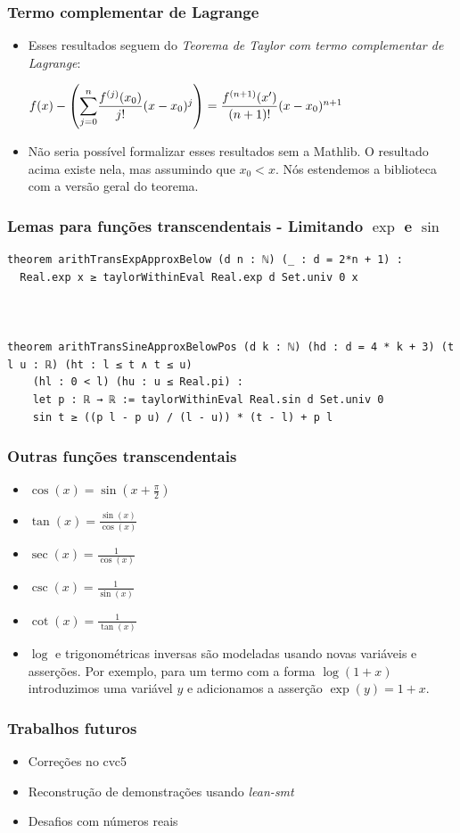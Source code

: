 \documentclass[usepdftitle=false,aspectratio=169,usenames,dvipsnames]{beamer}
\newcommand\vitem{\vfill\item}
\begin{document}
\begin{frame}
  \frametitle{Termo complementar de Lagrange}
  \begin{itemize}
    \item Esses resultados seguem do \textit{Teorema de Taylor com termo complementar de Lagrange}:

    \vfill
    \begin{center}
      $f(x) - \left( \mathlarger{\sum_{j=0}^{n}}\dfrac{f^{(j)}(x_0)}{j!}(x - x_0)^j \right) = \dfrac{f^{(n+1)}(x')}{(n+1)!}(x - x_0)^{n+1}$
    \end{center}
    \vitem Não seria possível formalizar esses resultados sem a Mathlib. O resultado acima existe nela, mas assumindo que $x_{0} < x$. Nós estendemos a biblioteca com a versão geral do teorema.
  \end{itemize}
\end{frame}

\begin{frame}[fragile]
  \frametitle{Lemas para funções transcendentais - Limitando $\exp$ e $\sin$}
\begin{lstlisting}
theorem arithTransExpApproxBelow (d n : ℕ) (_ : d = 2*n + 1) :
  Real.exp x ≥ taylorWithinEval Real.exp d Set.univ 0 x



theorem arithTransSineApproxBelowPos (d k : ℕ) (hd : d = 4 * k + 3) (t l u : ℝ) (ht : l ≤ t ∧ t ≤ u)
    (hl : 0 < l) (hu : u ≤ Real.pi) :
    let p : ℝ → ℝ := taylorWithinEval Real.sin d Set.univ 0
    sin t ≥ ((p l - p u) / (l - u)) * (t - l) + p l
\end{lstlisting}
\end{frame}

\begin{frame}
  \frametitle{Outras funções transcendentais}
  \begin{itemize}
    \item $\cos(x) = \sin(x + \frac{\pi}{2})$
    \vitem $\tan(x) = \frac{\sin(x)}{\cos(x)}$
    \vitem $\sec(x) = \frac{1}{\cos(x)}$
    \vitem $\csc(x) = \frac{1}{\sin(x)}$
    \vitem $\cot(x) = \frac{1}{\tan(x)}$
    \vitem $\log$ e trigonométricas inversas são modeladas usando novas variáveis e asserções. Por exemplo, para um termo com a forma $\log(1 + x)$ introduzimos uma variável $y$ e adicionamos a asserção $\exp(y) = 1 + x$.
  \end{itemize}
\end{frame}

\begin{frame}
  \frametitle{Trabalhos futuros}
  \begin{itemize}
    \item Correções no cvc5
    \vitem Reconstrução de demonstrações usando \textit{lean-smt}
    \vitem Desafios com números reais
  \end{itemize}
\end{frame}
\end{document}
